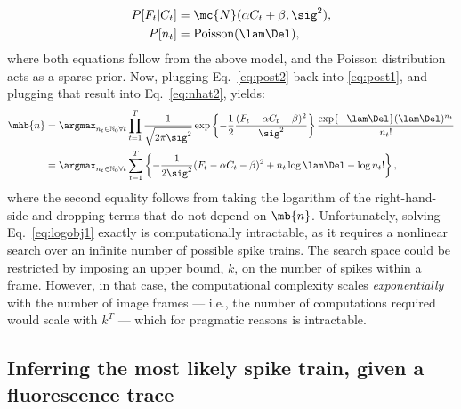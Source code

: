 \begin{subequations} \label{eq:post2}
\begin{align}
P[F_t | C_t] &= \mc{N}(\alpha C_t+\beta,\sig^2), \label{eq:lik2} \\
P[n_t] &= \text{Poisson}(\lam \Del), \label{eq:prior2} 
\end{align}
\end{subequations}
where both equations follow from the above model, and the Poisson distribution acts as a sparse prior.  Now, plugging Eq.~\eqref{eq:post2} back into \eqref{eq:post1}, and plugging that result into Eq.~\eqref{eq:nhat2}, yields:
\begin{subequations}  \label{eq:obj}
\begin{align}
\mhb{n} 	&= \anx \prod_{t=1}^T \frac{1}{\sqrt{2 \pi \sig^2}} \exp \left\{-\frac{1}{2}\frac{(F_t - \alpha C_t - \beta)^2}{\sig^2}\right\} \frac{\exp\{-\lam\Del\} (\lam\Del)^{n_t}}{n_t!}
\label{eq:obj1}\\ &= \anx  \sum_{t=1}^T \left\{ -\frac{1}{2 \sig^2}(F_t - \alpha C_t - \beta)^2  +  n_t \log \lam \Del - \log n_t! \right\}, \label{eq:logobj1}
\end{align} 
\end{subequations}
\noindent where the second equality follows from taking the logarithm of the right-hand-side and dropping terms that do not depend on $\mb{n}$.  Unfortunately, solving Eq.~\eqref{eq:logobj1} exactly is computationally intractable, as it requires a nonlinear search over an infinite number of  possible spike trains.  The search space could be restricted by imposing an upper bound, $k$, on the number of spikes within a frame.  However, in that case, the computational complexity scales \emph{exponentially} with the number of image frames --- i.e.,  the number of computations required would scale with $k^T$ --- which for pragmatic reasons is intractable.




\subsection{Inferring the most likely spike train, given a fluorescence trace} \label{sec:inf}


